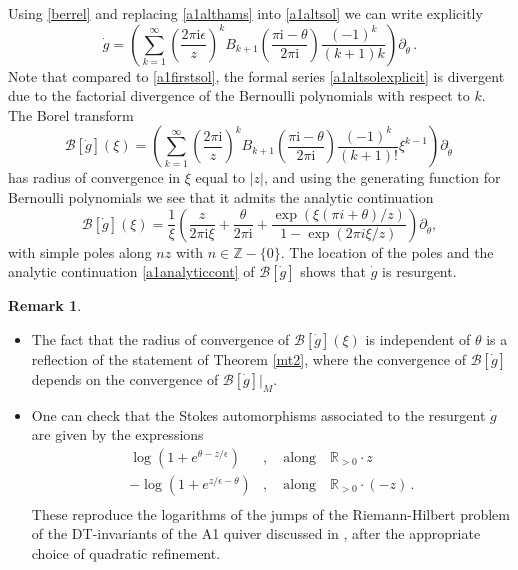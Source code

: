 \documentclass{article}
\theoremstyle{definition}
\newtheorem{remark}[theorem]{Remark}
\numberwithin{equation}{section}
\begin{document}
Using \eqref{berrel} and replacing \eqref{a1althams} into \eqref{a1altsol} we can write explicitly 
\begin{equation}\label{a1altsolexplicit}
\dot{g}=\left(\sum_{k=1}^{\infty}\left(\frac{2\pi \mathrm{i}\epsilon}{z}\right)^kB_{k+1}\left(\frac{\pi \mathrm{i}-\theta}{2\pi \mathrm{i}}\right)\frac{(-1)^{k}}{(k+1)k}\right)\partial_{\check{\theta}}\,.
\end{equation}
Note that compared to \eqref{a1firstsol}, the formal series \eqref{a1altsolexplicit} is divergent due to the factorial divergence of the Bernoulli polynomials with respect to $k$. The Borel transform 
\begin{equation*}
    \mathcal{B}[\dot{g}](\xi)=\left(\sum_{k=1}^{\infty}\left(\frac{2\pi \mathrm{i}}{z}\right)^kB_{k+1}\left(\frac{\pi \mathrm{i}-\theta}{2\pi \mathrm{i}}\right)\frac{(-1)^{k}}{(k+1)!}\xi^{k-1}\right)\partial_{\check{\theta}}\,
\end{equation*}
has radius of convergence in $\xi$ equal to $|z|$, and using the generating function for Bernoulli polynomials we see that it admits the analytic continuation
\begin{equation}\label{a1analyticcont}
    \mathcal{B}[\dot{g}](\xi)=\frac{1}{\xi}\left(\frac{z}{2\pi \mathrm{i}\xi}+\frac{\theta}{2\pi \mathrm{i}}+\frac{\exp(\xi(\pi i + \theta)/z)}{1-\exp(2\pi i \xi/z) }\right)\partial_{\check{\theta}},
\end{equation}
with simple poles along $nz$ with $n\in \mathbb{Z} -\{0\}$. The location of the poles and the analytic continuation \eqref{a1analyticcont} of $\mathcal{B}[\dot{g}]$ shows that $\dot{g}$ is resurgent. \\

\begin{remark}
    \begin{itemize}
        \item The fact that the radius of convergence of $\mathcal{B}[\dot{g}](\xi)$ is independent of $\theta$ is a reflection of the statement of Theorem \ref{mt2}, where the convergence of $\mathcal{B}[\dot{g}]$ depends on the convergence of $\mathcal{B}[\dot{g}]|_M$.
        \item One can check that the Stokes automorphisms associated to the resurgent $\dot{g}$ are given by the expressions
        \begin{equation}\label{A1Stokes}
        \begin{split}
            \log(1+e^{\theta-z/\epsilon})&, \quad \text{along} \quad \mathbb{R}_{>0}\cdot z\\
            -\log(1+e^{z/\epsilon-\theta})&, \quad \text{along} \quad \mathbb{R}_{>0}\cdot (-z)\,.\\
        \end{split}
        \end{equation}
        These reproduce the logarithms of the jumps of the Riemann-Hilbert problem of the DT-invariants of the A1 quiver discussed in \cite{varBPS}, after the appropriate choice of quadratic refinement. 
    \end{itemize}
\end{remark}
\end{document}
